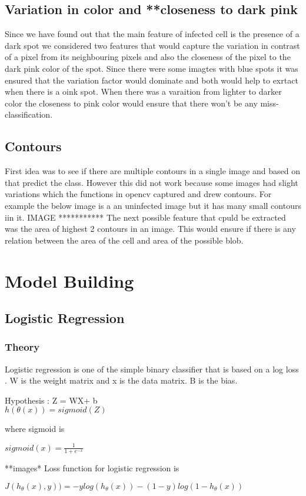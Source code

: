 \documentclass{scrreprt}
\begin{document}
\subsection{Variation in color and **closeness to dark pink}
			Since we have found out that the main feature of infected cell is the presence of a dark spot we considered two features that would capture the variation in contrast of a pixel from its neighbouring pixels and also the closeness of the pixel to the dark pink color of the spot. Since there were some imagtes with blue spots it was ensured that the variation factor would dominate and both would help to exrtact when there is a oink spot. When there was a varaition from lighter to darker color the closeness to pink color would ensure that there won't be any miss-classification.
\subsection{Contours}  
			First idea was to see if there are multiple contours in a single image and based on that predict the class. However this did not work because some images had slight variations which the functions in opencv captured and drew contours. For example the below image is a an uninfected image but it has many small contours iin it.
				{IMAGE ***********}
			The next possible feature that cpuld be extracted was the area of highest 2 contours in an image. This would ensure if there is any relation between the area of the cell and area of the possible blob.
			
\section{Model Building}

\subsection{Logistic Regression}
\subsubsection{Theory}
Logistic regression is one of the simple binary classifier that is based on a log loss .
W is the weight matrix and x is the data matrix. B is the bias.
\begin{center}
	Hypothesis : Z = WX+ b
	\\
	$h(\theta(x))  = sigmoid(Z)$ 
	\\
\end{center}
	where sigmoid is 
\begin{center} 
		$sigmoid(x) = \frac{1}{1+e^{-x}}$
\end{center}
**images*
Loss function for logistic regression is 
\begin{center}
$	J(h_{\theta}(x),y)) = -ylog(h_{\theta}(x)) - (1-y) log(1-h_{\theta}(x)) $
\end{center}
\end{document}
